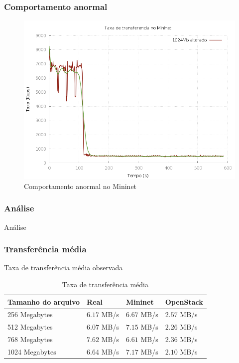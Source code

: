 \documentclass{beamer}
\begin{document}
\begin{frame}
    \frametitle{Comportamento anormal}

    \begin{figure}[h]
        \centering
        \includegraphics[width=.65\textwidth]{data/data_cp_mininet/taxa_1024_hue}
        \caption{Comportamento anormal no Mininet}
        \label{fig:zoera}
    \end{figure}
\end{frame}

\begin{frame}
    \frametitle{Análise}

    \begin{center}
        {\huge Análise}
    \end{center}
\end{frame}

\begin{frame}
    \frametitle{Transferência média}

    Taxa de transferência média observada

    \begin{table}[h]
        \centering
        \begin{tabular}{|l|l|l|l|}
            \hline
            Tamanho do arquivo & Real         &  Mininet      &  OpenStack   \\ \hline
            256  Megabytes     & $6.17$ MB/s  &  $6.67$ MB/s  &  $2.57$ MB/s \\
            512  Megabytes     & $6.07$ MB/s  &  $7.15$ MB/s  &  $2.26$ MB/s \\
            768  Megabytes     & $7.62$ MB/s  &  $6.61$ MB/s  &  $2.36$ MB/s \\
            1024 Megabytes     & $6.64$ MB/s  &  $7.17$ MB/s  &  $2.10$ MB/s \\ \hline
        \end{tabular}
        \caption{Taxa de transferência média}
        \label{tab_taxa_media}
    \end{table}

\end{frame}
\end{document}
